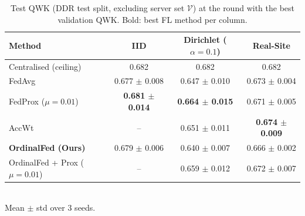 \begin{table}[!t]
\centering
\caption{Test QWK (DDR test split, excluding server set $\mathcal{V}$) at the round with the best validation QWK. Bold: best FL method per column.}
\label{tab:main}
\begin{tabular}{lccc}
\toprule
Method & IID & Dirichlet ($\alpha=0.1$) & Real-Site \\
\midrule
Centralised (ceiling) & 0.682 & 0.682 & 0.682 \\
\midrule
FedAvg & 0.677 $\pm$ 0.008 & 0.647 $\pm$ 0.010 & 0.673 $\pm$ 0.004 \\
FedProx ($\mu=0.01$) & \textbf{0.681 $\pm$ 0.014} & \textbf{0.664 $\pm$ 0.015} & 0.671 $\pm$ 0.005 \\
AccWt & -- & 0.651 $\pm$ 0.011 & \textbf{0.674 $\pm$ 0.009} \\
\textbf{OrdinalFed (Ours)} & 0.679 $\pm$ 0.006 & 0.640 $\pm$ 0.007 & 0.666 $\pm$ 0.002 \\
OrdinalFed + Prox ($\mu=0.01$) & -- & 0.659 $\pm$ 0.012 & 0.672 $\pm$ 0.007 \\
\bottomrule
\end{tabular}
\\[2pt]{\footnotesize Mean $\pm$ std over 3 seeds.}
\end{table}
